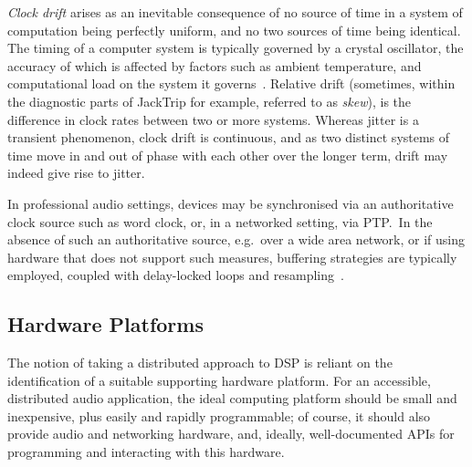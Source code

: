 \documentclass[utf8]{FrontiersinHarvard}
\begin{document}
    \textit{Clock drift} arises as an inevitable consequence of no source of
    time in a system of computation being perfectly uniform, and no two sources
    of time being identical.
    The timing of a computer system is typically governed by a crystal
    oscillator, the accuracy of which is affected by factors such as ambient
    temperature, and computational load on the system it
    governs~\citep{marouani_internal_2008}.
    Relative drift (sometimes, within the diagnostic parts of JackTrip for
    example, referred to as \textit{skew}), is the difference in clock rates
    between two or more systems.
    Whereas jitter is a transient phenomenon, clock drift is continuous, and as
    two distinct systems of time move in and out of phase with each other over
    the longer term, drift may indeed give rise to jitter.

    In professional audio settings, devices may be synchronised via an
    authoritative clock source such as word clock, or, in a networked setting,
    via PTP.\
    In the absence of such an authoritative source, e.g.\ over a wide area
    network, or if using hardware that does not support such measures, buffering
    strategies are typically employed, coupled with delay-locked loops and
    resampling~\citep{adriaensen_using_2005, adriaensen_controlling_2012}.

    \subsection{Hardware Platforms}\label{subsec:hardware-platforms}

    The notion of taking a distributed approach to DSP is reliant on the
    identification of a suitable supporting hardware platform.
    For an accessible, distributed audio application, the ideal computing platform
    should be small and inexpensive, plus easily and rapidly programmable;
    of course, it should also provide audio and networking hardware, and, ideally,
    well-documented APIs for programming and interacting with this hardware.
\end{document}
